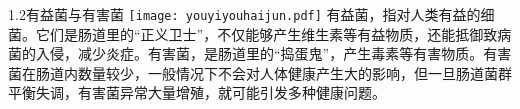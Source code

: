 

\usepackage{graphicx}
\graphicspath{{cores/}}



\vspace*{6mm}
\setlength{\arrayrulewidth}{1pt}
\fontsize{9.3pt}{11pt}\selectfont
\color{gray2}

\begin{LRaside}[.8]{1.2有益菌与有害菌}
\noindent
\texttt{[image: youyiyouhaijun.pdf]}
\asidebreak %
有益菌，指对人类有益的细菌。它们是肠道里的“正义卫士”，不仅能够产生维生素等有益物质，还能抵御致病菌的入侵，减少炎症。有害菌，是肠道里的“捣蛋鬼”，产生毒素等有害物质。有害菌在肠道内数量较少，一般情况下不会对人体健康产生大的影响，但一旦肠道菌群平衡失调，有害菌异常大量增殖，就可能引发多种健康问题。
\end{LRaside}

\vspace*{8mm}

